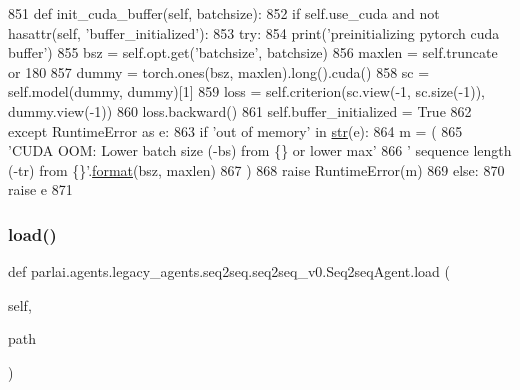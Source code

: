 \begin{DoxyCode}
851     \textcolor{keyword}{def }init\_cuda\_buffer(self, batchsize):
852         \textcolor{keywordflow}{if} self.use\_cuda \textcolor{keywordflow}{and} \textcolor{keywordflow}{not} hasattr(self, \textcolor{stringliteral}{'buffer\_initialized'}):
853             \textcolor{keywordflow}{try}:
854                 print(\textcolor{stringliteral}{'preinitializing pytorch cuda buffer'})
855                 bsz = self.opt.get(\textcolor{stringliteral}{'batchsize'}, batchsize)
856                 maxlen = self.truncate \textcolor{keywordflow}{or} 180
857                 dummy = torch.ones(bsz, maxlen).long().cuda()
858                 sc = self.model(dummy, dummy)[1]
859                 loss = self.criterion(sc.view(-1, sc.size(-1)), dummy.view(-1))
860                 loss.backward()
861                 self.buffer\_initialized = \textcolor{keyword}{True}
862             \textcolor{keywordflow}{except} RuntimeError \textcolor{keyword}{as} e:
863                 \textcolor{keywordflow}{if} \textcolor{stringliteral}{'out of memory'} \textcolor{keywordflow}{in} \hyperlink{namespacegenerate__task__READMEs_a5b88452ffb87b78c8c85ececebafc09f}{str}(e):
864                     m = (
865                         \textcolor{stringliteral}{'CUDA OOM: Lower batch size (-bs) from \{\} or lower max'}
866                         \textcolor{stringliteral}{' sequence length (-tr) from \{\}'}.\hyperlink{namespaceparlai_1_1chat__service_1_1services_1_1messenger_1_1shared__utils_a32e2e2022b824fbaf80c747160b52a76}{format}(bsz, maxlen)
867                     )
868                     \textcolor{keywordflow}{raise} RuntimeError(m)
869                 \textcolor{keywordflow}{else}:
870                     \textcolor{keywordflow}{raise} e
871 
\end{DoxyCode}
\mbox{\label{classparlai_1_1agents_1_1legacy__agents_1_1seq2seq_1_1seq2seq__v0_1_1Seq2seqAgent_a2aabe1e56b7b94f46875ae7f704f681f}} 
\subsubsection{\texorpdfstring{load()}{load()}}
{\footnotesize\ttfamily def parlai.\+agents.\+legacy\+\_\+agents.\+seq2seq.\+seq2seq\+\_\+v0.\+Seq2seq\+Agent.\+load (\begin{DoxyParamCaption}\item[{}]{self,  }\item[{}]{path }\end{DoxyParamCaption})}

